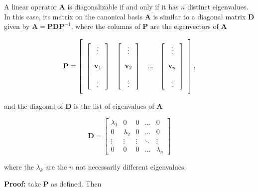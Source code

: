 \begin{theorem} \label{theo:diagonalization} %
	A linear operator $\mathbf{A}$ is diagonalizable if and only if it has $n$ distinct eigenvalues. In this case, its matrix on the canonical basis $\mathbf{A}$ is similar to a diagonal matrix $\mathbf{D}$ given by $\mathbf{A} = \mathbf{P}\mathbf{D}\mathbf{P}^{-1}$, where the columns of $\mathbf{P}$ are the eigenvectors of $\mathbf{A}$

\begin{equation} \mathbf{P} = \left[\raisebox{15mm}{} \begin{array}{cccc} \left[\begin{array}{c} \vdots \\[3mm] \mathbf{v}_1 \\[3mm] \vdots \end{array}\right] & \left[\begin{array}{c} \vdots \\[3mm] \mathbf{v}_2 \\[3mm] \vdots \end{array}\right] & ... & \left[\begin{array}{c} \vdots \\[3mm] \mathbf{v}_n \\[3mm] \vdots \end{array}\right] \end{array}\right], \end{equation}

	and the diagonal of $\mathbf{D}$ is the list of eigenvalues of $\mathbf{A}$

\begin{equation} \mathbf{D} = \left[\begin{array}{ccccc}\lambda_1 & 0 & 0 & ... & 0 \\[3mm] 0 & \lambda_2 & 0 & ... & 0 \\[3mm] \vdots & \vdots & \vdots & \ddots & \vdots \\[3mm] 0 & 0 & 0 & ... & \lambda_n \end{array}\right] \end{equation}

	where the $\lambda_k$ are the $n$ not necessarily different eigenvalues. 

\end{theorem}
\textbf{Proof:} take $\mathbf{P}$ as defined. Then

